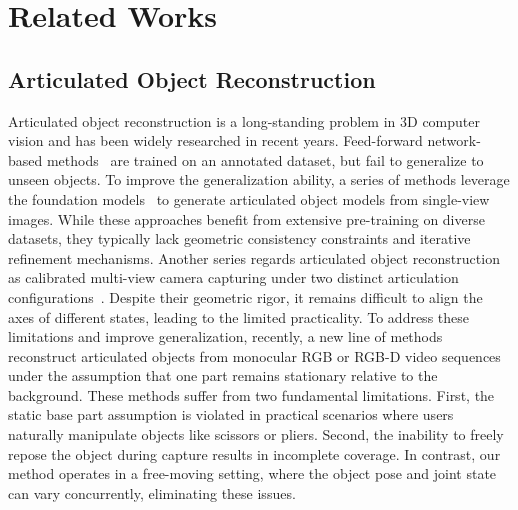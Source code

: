 \section{Related Works}

\subsection{Articulated Object Reconstruction}

Articulated object reconstruction is a long-standing problem in 3D computer vision and has been widely researched in recent years. 
Feed-forward network-based methods~\cite{ditto,kawana2023detection,qian2022understanding,sun2024opdmulti,geng2023gapartnet,heppert2023carto,yu2024gamma,wang2024rpmart} are trained on an annotated dataset, but fail to generalize to unseen objects. 
To improve the generalization ability, a series of methods leverage the foundation models~\cite{articulateanything,realcode,chen2024urdformer,qiu2025articulate} to generate articulated object models from single-view images. While these approaches benefit from extensive pre-training on diverse datasets, they typically lack geometric consistency constraints and iterative refinement mechanisms. 
Another series regards articulated object reconstruction as calibrated multi-view camera capturing under two distinct articulation configurations~\cite{splart,reartgs,artgs,guo2025articulatedgs,liu2023paris,wang2024sm,weng2024neural}. Despite their geometric rigor, it remains difficult to align the axes of different states, leading to the limited practicality. 
To address these limitations and improve generalization, recently, a new line of methods~\cite{rsrd,video2articulation,wu2025predict,monomobility} reconstruct articulated objects from monocular RGB or RGB-D video sequences under the assumption that one part remains stationary relative to the background. 
These methods suffer from two fundamental limitations. First, the static base part assumption is violated in practical scenarios where users naturally manipulate objects like scissors or pliers. Second, the inability to freely repose the object during capture results in incomplete coverage. In contrast, our method operates in a free-moving setting, where the object pose and joint state can vary concurrently, eliminating these issues.
\vspace{-2pt}
